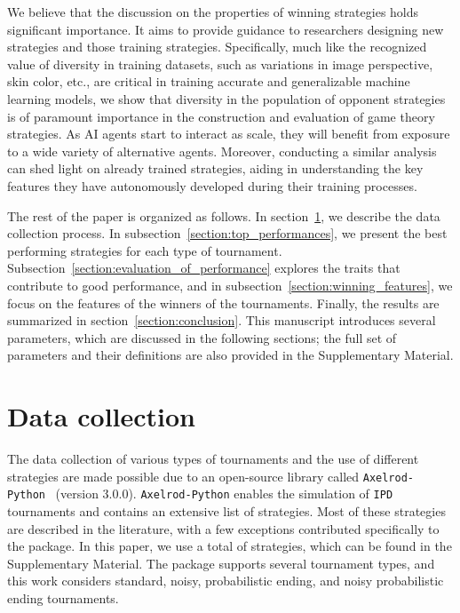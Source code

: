 \documentclass{article}
\newcommand{\numberofstrategies}{}
\def\axelrod{\texttt{Axelrod-Python}}
\def\IPD{\texttt{IPD}}
\begin{document}
We believe that the discussion on the properties of winning strategies holds
significant importance. It aims to provide guidance to researchers designing new
strategies and those training strategies. Specifically, much like the recognized
value of diversity in training datasets, such as variations in image perspective,
skin color, etc., are critical in training accurate and generalizable machine
learning models, we show that diversity in the population of opponent strategies
is of paramount importance in the construction and evaluation of game theory
strategies. As AI agents start to interact as scale, they will benefit from
exposure to a wide variety of alternative agents. Moreover, conducting a similar
analysis can shed light on already trained strategies, aiding in understanding
the key features they have autonomously developed during their training
processes.

The rest of the paper is organized as follows. In
section~\ref{section:data_collection}, we describe the data collection process.
In subsection~\ref{section:top_performances}, we present the best performing
strategies for each type of tournament.
Subsection~\ref{section:evaluation_of_performance} explores the traits that
contribute to good performance, and in
subsection~\ref{section:winning_features}, we focus on the features of the
winners of the tournaments. Finally, the results are summarized in
section~\ref{section:conclusion}. This manuscript introduces several parameters,
which are discussed in the following sections; the full set of parameters and
their definitions are also provided in the Supplementary Material.

\section{Data collection}\label{section:data_collection}

The data collection of various types of tournaments and the use of different
strategies are made possible due to an open-source library called \axelrod{}~\cite{axelrodproject}
(version 3.0.0). \axelrod{} enables the simulation of \IPD{}
tournaments and contains an extensive list of strategies. Most of these
strategies are described in the literature, with a few exceptions contributed
specifically to the package. In this paper, we use a total of
\numberofstrategies strategies, which can be found in the Supplementary
Material. The package supports several tournament types, and this work considers
standard, noisy, probabilistic ending, and noisy probabilistic ending
tournaments.
\end{document}
